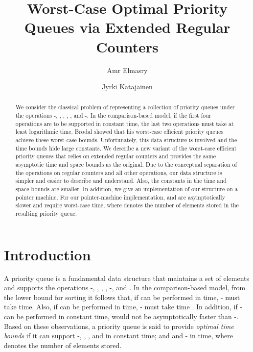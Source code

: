 \documentclass{llncs}
\newcommand{\Findmin}{\mbox{\mbox{\rm -}}}
\newcommand{\Insert}{\mbox{}}
\newcommand{\Deletemin}{\mbox{\mbox{\rm -}}}
\newcommand{\Decrease}{\mbox{}}
\newcommand{\Delete}{\mbox{}}
\newcommand{\Meld}{\mbox{}}
\begin{document}
\title{Worst-Case Optimal Priority Queues via Extended Regular Counters}

\author{Amr Elmasry \and Jyrki Katajainen}


\date{}
\maketitle 
\pagestyle{plain}

\begin{abstract}
We consider the classical problem of representing a collection of
priority queues under the operations \Findmin{}, \Insert{},
\Decrease{}, \Meld{}, \Delete{}, and \Deletemin{}.  In the
comparison-based model, if the first four operations are to be
supported in constant time, the last two operations must
take at least logarithmic time. Brodal showed that his
worst-case efficient priority queues achieve these worst-case bounds.
Unfortunately, this data structure is involved and the time bounds hide large
constants. We describe a new variant of the worst-case efficient priority 
queues that relies on extended regular counters and provides the same 
asymptotic time and space bounds as the original. Due to the conceptual 
separation of the operations on regular counters and all other operations, 
our data structure is simpler and easier to describe and understand. 
Also, the constants in the time and space bounds are smaller.
In addition, we give an implementation of our structure on a pointer machine.  
For our pointer-machine implementation, \Decrease{} and \Meld{} are asymptotically 
slower and require  worst-case time, where  denotes the number 
of elements stored in the resulting priority queue.
\end{abstract}

\section{Introduction}

A priority queue is a fundamental data structure that maintains a set of elements
and supports the operations \Findmin{}, \Insert{}, \Decrease{}, \Delete{}, 
\Deletemin{}, and \Meld{}.  
In the comparison-based model, from the  lower bound for
sorting it follows that, if \Insert{} can be performed in 
time, \Deletemin{} must take  time. Also, if \Meld{}
can be performed in  time, \Deletemin{} must take  time \cite{Bro95}.  In addition, if \Findmin{} can be performed in
constant time, \Delete{} would not be asymptotically faster than
\Deletemin{}.  Based on these observations, a priority queue is said
to provide \emph{optimal time bounds} if it can support \Findmin{},
\Insert{}, \Decrease{}, and \Meld{} in constant time; and \Delete{} and 
\Deletemin{} in  time, where  denotes the number of elements stored.
\end{document}
